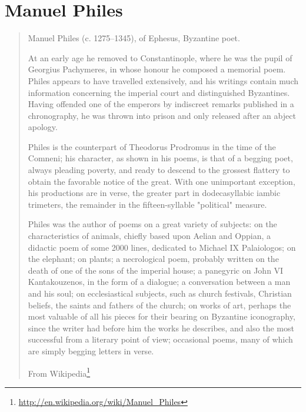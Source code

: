 \documentclass[12pt,letterpaper,twoside,final]{memoir}
\begin{document}
\section{Manuel Philes}
\blockquote[From Wikipedia\footnote{\url{http://en.wikipedia.org/wiki/Manuel_Philes}}]{Manuel Philes (c. 1275–1345), of Ephesus, Byzantine poet.

At an early age he removed to Constantinople, where he was the pupil of Georgius Pachymeres, in whose honour he composed a memorial poem. Philes appears to have travelled extensively, and his writings contain much information concerning the imperial court and distinguished Byzantines. Having offended one of the emperors by indiscreet remarks published in a chronography, he was thrown into prison and only released after an abject apology.

Philes is the counterpart of Theodorus Prodromus in the time of the Comneni; his character, as shown in his poems, is that of a begging poet, always pleading poverty, and ready to descend to the grossest flattery to obtain the favorable notice of the great. With one unimportant exception, his productions are in verse, the greater part in dodecasyllabic iambic trimeters, the remainder in the fifteen-syllable "political" measure.

Philes was the author of poems on a great variety of subjects: on the characteristics of animals, chiefly based upon Aelian and Oppian, a didactic poem of some 2000 lines, dedicated to Michael IX Palaiologos; on the elephant; on plants; a necrological poem, probably written on the death of one of the sons of the imperial house; a panegyric on John VI Kantakouzenos, in the form of a dialogue; a conversation between a man and his soul; on ecclesiastical subjects, such as church festivals, Christian beliefs, the saints and fathers of the church; on works of art, perhaps the most valuable of all his pieces for their bearing on Byzantine iconography, since the writer had before him the works he describes, and also the most successful from a literary point of view; occasional poems, many of which are simply begging letters in verse.}
\end{document}
